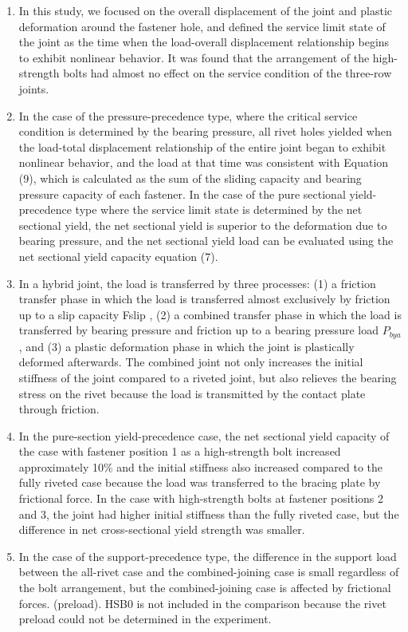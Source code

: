 \begin{enumerate}
    \item In this study, we focused on the overall displacement of the joint and plastic deformation around the fastener hole, and defined the service limit state of the joint as the time when the load-overall displacement relationship begins to exhibit nonlinear behavior. It was found that the arrangement of the high-strength bolts had almost no effect on the service condition of the three-row joints.

    \item  In the case of the pressure-precedence type, where the critical service condition is determined by the bearing pressure, all rivet holes yielded when the load-total displacement relationship of the entire joint began to exhibit nonlinear behavior, and the load at that time was consistent with Equation (9), which is calculated as the sum of the sliding capacity and bearing pressure capacity of each fastener. In the case of the pure sectional yield-precedence type where the service limit state is determined by the net sectional yield, the net sectional yield is superior to the deformation due to bearing pressure, and the net sectional yield load can be evaluated using the net sectional yield capacity equation (7).

    \item  In a hybrid joint, the load is transferred by three processes: (1) a friction transfer phase in which the load is transferred almost exclusively by friction up to a slip capacity Fslip , (2) a combined transfer phase in which the load is transferred by bearing pressure and friction up to a bearing pressure load $P_{bya}$ , and (3) a plastic deformation phase in which the joint is plastically deformed afterwards. The combined joint not only increases the initial stiffness of the joint compared to a riveted joint, but also relieves the bearing stress on the rivet because the load is transmitted by the contact plate through friction.

    \item  In the pure-section yield-precedence case, the net sectional yield capacity of the case with fastener position 1 as a high-strength bolt increased approximately 10\% and the initial stiffness also increased compared to the fully riveted case because the load was transferred to the bracing plate by frictional force. In the case with high-strength bolts at fastener positions 2 and 3, the joint had higher initial stiffness than the fully riveted case, but the difference in net cross-sectional yield strength was smaller.

    \item In the case of the support-precedence type, the difference in the support load between the all-rivet case and the combined-joining case is small regardless of the bolt arrangement, but the combined-joining case is affected by frictional forces. (preload). HSB0 is not included in the comparison because the rivet preload could not be determined in the experiment.

\end{enumerate}

